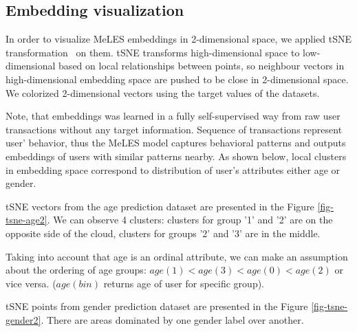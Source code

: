 \documentclass{article}
\begin{document}
\subsection{Embedding visualization}

In order to visualize MeLES embeddings in 2-dimensional space, we applied tSNE transformation~\cite{Maaten2008VisualizingDU} on them. tSNE transforms high-dimensional space to low-dimensional based on local relationships between points, so neighbour vectors in high-dimensional embedding space are pushed to be close in 2-dimensional space. We colorized 2-dimensional vectors using the target values of the datasets.

Note, that embeddings was learned in a fully self-supervised way from raw user transactions without any target information. Sequence of transactions represent user' behavior, thus the MeLES model captures behavioral patterns and outputs embeddings of users with similar patterns nearby.
As shown below, local clusters in embedding space correspond to distribution of user's attributes either age or gender.

tSNE vectors from the age prediction dataset are presented in the Figure \ref{fig-tsne-age2}. We can observe 4 clusters: clusters for group '1' and '2' are on the opposite side of the cloud, clusters for groups '2' and '3' are in the middle.

Taking into account that age is an ordinal attribute, we can make an assumption about the ordering of age groups: $age(1) < age(3) < age(0) < age(2)$ or vice versa. ($age(bin)$ returns age of user for specific group).

tSNE points from gender prediction dataset are presented in the Figure \ref{fig-tsne-gender2}. There are areas dominated by one gender label over another.
\end{document}
